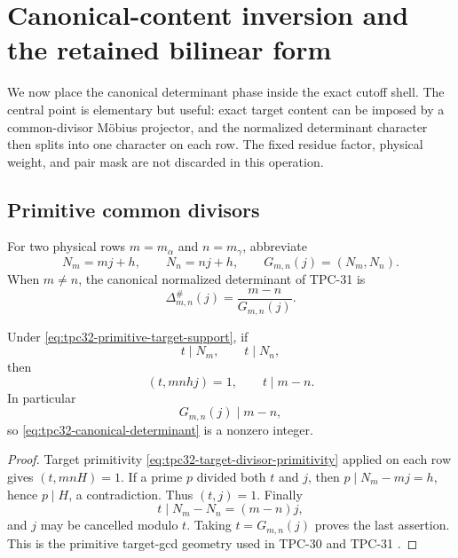 \section{Canonical-content inversion and the retained bilinear form}
\label{sec:tpc32-canonical-factorization}

We now place the canonical determinant phase inside the exact cutoff
shell.  The central point is elementary but useful: exact target
content can be imposed by a common-divisor M\"obius projector, and the
normalized determinant character then splits into one character on
each row.  The fixed residue factor, physical weight, and pair mask are
not discarded in this operation.

\subsection{Primitive common divisors}

For two physical rows \(m=m_\alpha\) and \(n=m_\gamma\), abbreviate
\begin{equation}
 N_m=mj+h,\qquad N_n=nj+h,
 \qquad G_{m,n}(j)=(N_m,N_n).
 \label{eq:tpc32-two-targets-content}
\end{equation}
When \(m\ne n\), the canonical normalized determinant of TPC-31 is
\begin{equation}
 \Delta^\#_{m,n}(j)=\frac{m-n}{G_{m,n}(j)}.
 \label{eq:tpc32-canonical-determinant}
\end{equation}

\begin{lemma}
\label{lem:tpc32-common-divisor-row-difference}
Under \eqref{eq:tpc32-primitive-target-support}, if
\begin{equation}
 t\mid N_m,\qquad t\mid N_n,
 \label{eq:tpc32-common-target-divisor}
\end{equation}
then
\begin{equation}
 (t,mnhj)=1,\qquad t\mid m-n.
 \label{eq:tpc32-common-divisor-properties}
\end{equation}
In particular
\begin{equation}
 G_{m,n}(j)\mid m-n,
 \label{eq:tpc32-content-divides-difference}
\end{equation}
so \eqref{eq:tpc32-canonical-determinant} is a nonzero integer.
\end{lemma}

\begin{proof}
Target primitivity \eqref{eq:tpc32-target-divisor-primitivity} applied
on each row gives \((t,mnH)=1\).  If a prime \(p\) divided both \(t\)
and \(j\), then \(p\mid N_m-mj=h\), hence \(p\mid H\), a
contradiction.  Thus \((t,j)=1\).  Finally
\[
 t\mid N_m-N_n=(m-n)j,
\]
and \(j\) may be cancelled modulo \(t\).  Taking \(t=G_{m,n}(j)\)
proves the last assertion.  This is the primitive target-gcd geometry
used in TPC-30 and TPC-31
\citep{WangTPC30,WangTPC31}.
\end{proof}

